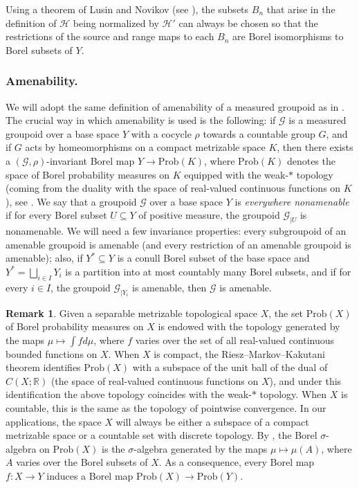 \documentclass[11pt]{article}
\numberwithin{equation}{section}
\let\mathcal\mathscr
\theoremstyle{plain}
\theoremstyle{definition}
\newtheorem{rk}[theo]{Remark}
\let\Dunion\bigsqcup
\newcommand{\calg}{\mathcal{G}}
\newcommand{\calh}{\mathcal{H}}
\newcommand{\Prob}{\mathrm{Prob}}
\begin{document}
Using a theorem of Lusin and Novikov (see \cite[Th.\,18.10]{Kec}), the subsets $B_n$ that arise in the definition of $\calh$ being normalized by $\calh'$ can always be chosen so that the restrictions of the source and range maps to each $B_n$ are Borel isomorphisms to Borel subsets of $Y$.

\subsubsection*{Amenability.}

We will adopt the same definition of amenability of a measured groupoid as in \cite{Kid-survey}. The crucial way in which amenability is used is the following: if $\calg$ is a measured groupoid over a base space $Y$ with a cocycle $\rho$ towards a countable group $G$, and if $G$ acts by homeomorphisms on a compact metrizable space $K$, then there exists a $(\calg,\rho)$-invariant Borel map $Y\to\Prob(K)$, where $\Prob(K)$ denotes the space of Borel probability measures on $K$ equipped with the weak-$*$ topology (coming from the duality with the space of real-valued continuous functions on $K$), see \cite[Prop.\,4.14]{Kid-survey}. We say that a groupoid $\calg$ over a base space $Y$ is \emph{everywhere nonamenable} if for every Borel subset $U\subseteq Y$ of positive measure, the groupoid $\calg_{|U}$ is nonamenable. We will need a few invariance properties: every subgroupoid of an amenable groupoid is amenable \cite[Th.\,4.16]{Kid-survey} (and every restriction of an amenable groupoid is amenable); also, if $Y^*\subseteq Y$ is a conull Borel subset of the base space and $Y^*=\Dunion_{i\in I} Y_i$ is a partition into at most countably many Borel subsets, and if for every $i\in I$, the groupoid $\calg_{|Y_i}$ is amenable, then $\calg$ is amenable.

\begin{rk}
\label{rk:Borel}
Given a separable metrizable topological space $X$, the set $\Prob(X)$ of Borel probability measures on $X$ is endowed with the topology generated by the maps $\mu\mapsto\int fd\mu$, where $f$ varies over the set of all real-valued continuous bounded functions on $X$. When $X$ is compact, the Riesz--Markov--Kakutani theorem identifies $\Prob(X)$ with a subspace of the unit ball of the dual of $C(X;\mathbb{R})$ (the space of real-valued continuous functions on $X$), and under this identification the above topology coincides with the weak-$*$ topology. When $X$ is countable, this is the same as the topology of pointwise convergence. In our applications, the space $X$ will always be either a subspace of a compact metrizable space or a countable set with discrete topology. By \cite[Th.\,17.24]{Kec}, the Borel $\sigma$-algebra on $\Prob(X)$ is the $\sigma$-algebra generated by the maps $\mu\mapsto\mu(A)$, where $A$ varies over the Borel subsets of $X$. As a consequence, every Borel map $f:X\to Y$ induces a Borel map $\Prob(X)\to\Prob(Y)$.
\end{rk}
\end{document}
